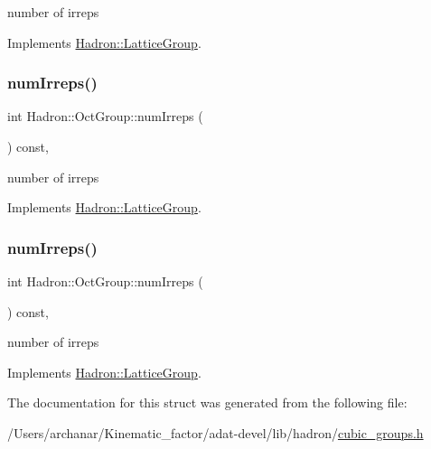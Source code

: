 number of irreps 

Implements \mbox{\hyperlink{structHadron_1_1LatticeGroup_a3edaca488144b5d2a9cf73fe653add34}{Hadron\+::\+Lattice\+Group}}.

\mbox{\label{structHadron_1_1OctGroup_aed56aa6c4ed7e2a82048b478c916b9d2}} 
\subsubsection{\texorpdfstring{numIrreps()}{numIrreps()}\hspace{0.1cm}{\footnotesize\ttfamily [2/3]}}
{\footnotesize\ttfamily int Hadron\+::\+Oct\+Group\+::num\+Irreps (\begin{DoxyParamCaption}{ }\end{DoxyParamCaption}) const\hspace{0.3cm}{\ttfamily [inline]}, {\ttfamily [virtual]}}

number of irreps 

Implements \mbox{\hyperlink{structHadron_1_1LatticeGroup_a3edaca488144b5d2a9cf73fe653add34}{Hadron\+::\+Lattice\+Group}}.

\mbox{\label{structHadron_1_1OctGroup_aed56aa6c4ed7e2a82048b478c916b9d2}} 
\subsubsection{\texorpdfstring{numIrreps()}{numIrreps()}\hspace{0.1cm}{\footnotesize\ttfamily [3/3]}}
{\footnotesize\ttfamily int Hadron\+::\+Oct\+Group\+::num\+Irreps (\begin{DoxyParamCaption}{ }\end{DoxyParamCaption}) const\hspace{0.3cm}{\ttfamily [inline]}, {\ttfamily [virtual]}}

number of irreps 

Implements \mbox{\hyperlink{structHadron_1_1LatticeGroup_a3edaca488144b5d2a9cf73fe653add34}{Hadron\+::\+Lattice\+Group}}.



The documentation for this struct was generated from the following file\+:\begin{DoxyCompactItemize}
\item 
/\+Users/archanar/\+Kinematic\+\_\+factor/adat-\/devel/lib/hadron/\mbox{\hyperlink{adat-devel_2lib_2hadron_2cubic__groups_8h}{cubic\+\_\+groups.\+h}}\end{DoxyCompactItemize}
